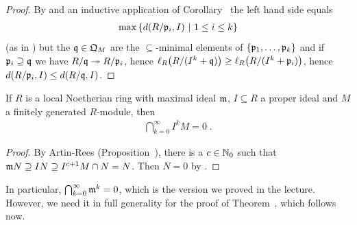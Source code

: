 \documentclass[a4paper,parskip=half,numbers=enddot, DIV=12]{scrreprt}
\begin{document}
\begin{proof}
    By  and an inductive application of Corollary~ the left hand side equals 
    \begin{align*}
        \max\left\{d(R/\mathfrak{p}_i,I)\ \middle|\  1 \leq i \leq k\right\}
    \end{align*}
    (as in ) but the $\mathfrak{q}\in \mathfrak{Q}_M$ are the $\subseteq$-minimal elements of $\left\{\mathfrak{p}_1,\ldots,\mathfrak{p}_k\right\}$ and if $\mathfrak{p}_i\supseteq \mathfrak{q}$ we have $R/\qq \epimorphism R/\pp_i$, hence $\ell_R\big(R/(I^k+\mathfrak{q})\big) \geq \ell_R\big(R/(I^k +\mathfrak{p}_i)\big)$, hence $d(R/\mathfrak{p}_i,I) \leq d(R/\mathfrak{q},I)$.
\end{proof}
\begin{cor}
    If $R$ is a local Noetherian ring with maximal ideal $\mathfrak{m}$, $I\subseteq R$ a proper ideal and $M$ a finitely generated $R$-module, then 
    \begin{align*}
        \bigcap_{k=0}^\infty I^kM =0\;.
    \end{align*}
\end{cor}
\begin{proof}
    By Artin-Rees (Proposition~), there is a $c\in\mathbb{N}_0$ such that $\mathfrak{m} N \supseteq IN\supseteq I^{c+1} M \cap N = N$. Then $N=0$ by \NAK.
\end{proof}
\begin{rem*}
	In particular, $\bigcap_{k=0}^\infty\mathfrak{m}^k=0$, which is the version we proved in the lecture. However, we need it in full generality for the proof of Theorem~, which follows now.
\end{rem*}
\end{document}
